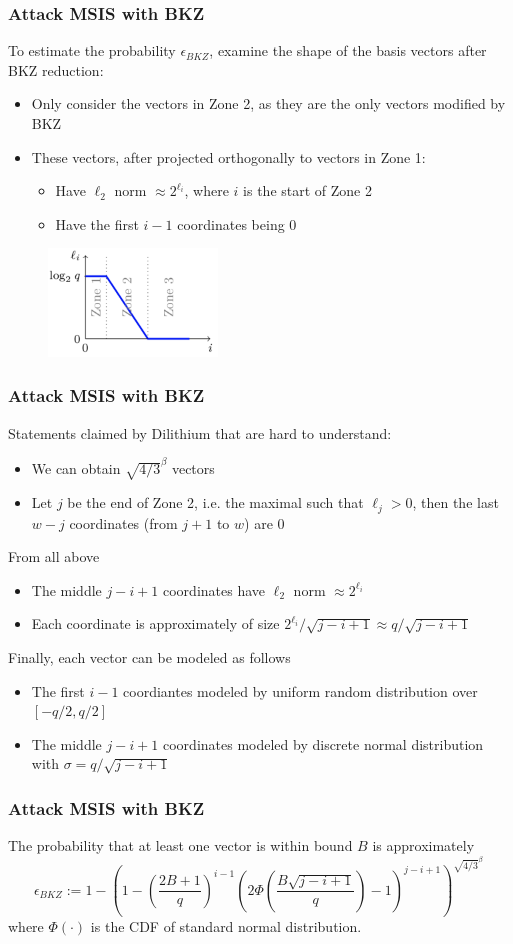\documentclass{beamer}
\begin{document}
\frame
{
  \frametitle{Attack MSIS with BKZ}
  To estimate the probability $\epsilon_{BKZ}$, examine the shape of the basis vectors after BKZ reduction:
  \begin{itemize}
    \item Only consider the vectors in Zone 2, as they are the only vectors modified by BKZ
    \item These vectors, after projected orthogonally to vectors in Zone 1:
    \begin{itemize}
      \item Have $\ell_2$ norm $\approx 2^{\ell_i}$, where $i$ is the start of Zone 2
      \item Have the first $i-1$ coordinates being $0$
    \end{itemize}
  \end{itemize}
  \begin{figure}[ht!]
  \includegraphics[width=0.4\textwidth]{files/after-reduction.png}
  \end{figure}
}

\frame
{
  \frametitle{Attack MSIS with BKZ}
  Statements claimed by Dilithium that are \alert{hard to understand}:
  \begin{itemize}
    \item We can obtain $\sqrt{4/3}^{\beta}$ vectors
    \item Let $j$ be the end of Zone 2, i.e. the maximal such that $\ell_j>0$, then the last $w-j$ coordinates (from $j+1$ to $w$) are $0$
  \end{itemize}
  From all above
  \begin{itemize}
    \item The middle $j-i+1$ coordinates have $\ell_2$ norm $\approx 2^{\ell_i}$
    \item Each coordinate is approximately of size $2^{\ell_i}/\sqrt{j-i+1}\approx q/\sqrt{j-i+1}$
  \end{itemize}
  Finally, each vector can be modeled as follows
  \begin{itemize}
    \item The first $i-1$ coordiantes modeled by uniform random distribution over $[-q/2, q/2]$
    \item The middle $j-i+1$ coordinates modeled by discrete normal distribution with $\sigma=q/\sqrt{j-i+1}$
  \end{itemize}
}

\frame
{
  \frametitle{Attack MSIS with BKZ}
  The probability that at least one vector is within bound $B$ is approximately
  \[
  	 \epsilon_{BKZ}:=1-\left(1-\left(\frac{2B+1}{q}\right)^{i-1}\left(2\Phi\left(\frac{B\sqrt{j-i+1}}{q}\right)-1\right)^{j-i+1}\right)^{\sqrt{4/3}^{\beta}}\,
  \]
  where $\Phi(\cdot)$ is the CDF of standard normal distribution.
}

\end{document}
